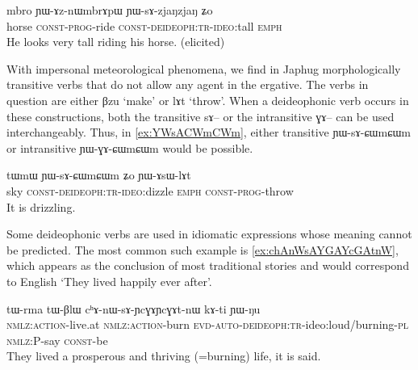\documentclass[oldfontcommands,oneside,a4paper,11pt]{article}
\newcommand{\ipa}[1]{{\phon \mbox{#1}}} %
\begin{document}
     \begin{exe}
     \ex \label{ex:YWsAzjaNzjaN2}
\gll
\ipa{mbro} 		\ipa{ɲɯ-ɤz-nɯmbrɤpɯ} \ipa{ɲɯ-sɤ-zjaŋzjaŋ} 	\ipa{ʑo} \\
horse  \textsc{const-prog}-ride \textsc{const-deideoph:tr-ideo}:tall \textsc{emph}\\
\glt He looks very tall riding his horse. (elicited)
\end{exe}

With impersonal meteorological phenomena, we find in Japhug morphologically transitive verbs that do not allow any agent in the ergative. The verbs in question are either \ipa{βzu} `make' or \ipa{lɤt} `throw'. When a deideophonic verb occurs in these constructions, both the transitive \ipa{sɤ--} or the intransitive \ipa{ɣɤ--} can be used interchangeably. Thus, in \ref{ex:YWsACWmCWm}, either transitive	\ipa{ɲɯ-sɤ-ɕɯmɕɯm} or 	intransitive \ipa{ɲɯ-ɣɤ-ɕɯmɕɯm} would be possible.

     \begin{exe}
     \ex \label{ex:YWsACWmCWm}
\gll
\ipa{tɯmɯ} 	\ipa{ɲɯ-sɤ-ɕɯmɕɯm} 	\ipa{ʑo} 	\ipa{ɲɯ-ɤsɯ-lɤt} \\
sky \textsc{const-deideoph:tr-ideo}:dizzle \textsc{emph} \textsc{const-prog}-throw \\
\glt It is drizzling.
\end{exe}
 
Some deideophonic verbs are used in idiomatic expressions whose meaning cannot be predicted. The most common such example is \ref{ex:chAnWsAYGAYcGAtnW}, which appears as the conclusion of most traditional stories and would correspond to English `They lived happily ever after'.

     \begin{exe}
\ex \label{ex:chAnWsAYGAYcGAtnW}
\gll 
\ipa{tɯ-rma}  	\ipa{tɯ-βlɯ}  	\ipa{cʰɤ-nɯ-sɤ-ɲcɣɤɲcɣɤt-nɯ}  	\ipa{kɤ-ti}  	\ipa{ɲɯ-ŋu}  \\
\textsc{nmlz:action}-live.at \textsc{nmlz:action}-burn \textsc{evd-auto-deideoph:tr}-ideo:loud/burning-\textsc{pl} \textsc{nmlz}:P-say \textsc{const}-be \\
\glt  They lived a prosperous and thriving (=burning) life, it is said.
\end{exe}


 	  
\end{document}
